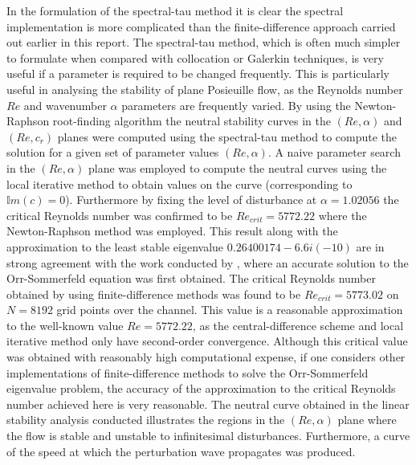 \documentclass[a4paper, 12pt, twoside, openright]{article}
\numberwithin{equation}{section}
\begin{document}
In the formulation of the spectral-tau method it is clear the spectral implementation is more complicated than the finite-difference approach carried out earlier in this report. The spectral-tau method, which is often much simpler to formulate when compared with collocation or Galerkin techniques, is very useful if a parameter is required to be changed frequently. This is particularly useful in analysing the stability of plane Posieuille flow, as the Reynolds number $Re$ and wavenumber $\alpha$ parameters are frequently varied. By using the Newton-Raphson root-finding algorithm the neutral stability curves in the $(Re,\alpha)$ and $(Re,c_r)$ planes were computed using the spectral-tau method to compute the solution for a given set of parameter values $(Re,\alpha)$. A naive parameter search in the $(Re,\alpha)$ plane was employed to compute the neutral curves using the local iterative method to obtain values on the curve (corresponding to $\mathbb{I}m(c)=0$). Furthermore by fixing the level of disturbance at $\alpha=1.02056$ the critical Reynolds number was confirmed to be $Re_{crit}=5772.22$ where the Newton-Raphson method was employed. This result along with the approximation to the least stable eigenvalue $0.26400174 - 6.6i(-10)$ are in strong agreement with the work conducted by \cite{Orszag71}, where an accurate solution to the Orr-Sommerfeld equation was first obtained. The critical Reynolds number obtained by using finite-difference methods was found to be $Re_{crit}=5773.02$ on $N=8192$ grid points over the channel. This value is a reasonable approximation to the well-known value $Re=5772.22$, as the central-difference scheme and local iterative method only have second-order convergence. Although this critical value was obtained with reasonably high computational expense, if one considers other implementations of finite-difference methods to solve the Orr-Sommerfeld eigenvalue problem, the accuracy of the approximation to the critical Reynolds number achieved here is very reasonable. The neutral curve obtained in the linear stability analysis conducted illustrates the regions in the $(Re,\alpha)$ plane where the flow is stable and unstable to infinitesimal disturbances. Furthermore, a curve of the speed at which the perturbation wave propagates was produced.  
\end{document}
